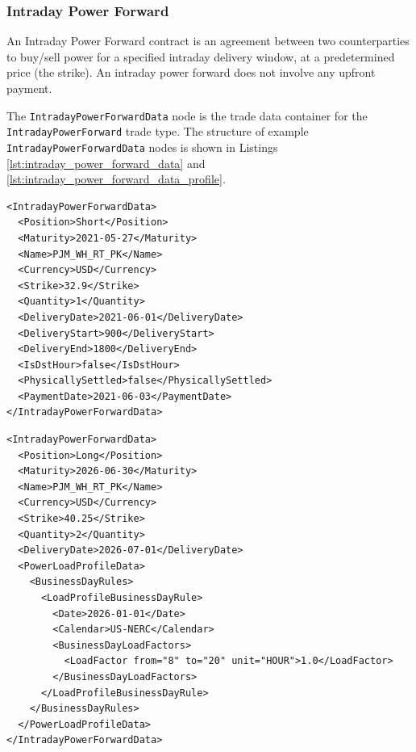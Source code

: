 \subsubsection{Intraday Power Forward}

An Intraday Power Forward contract is an agreement between two counterparties to buy/sell
power for a specified intraday delivery window, at a predetermined price (the strike).
An intraday power forward does not involve any upfront payment.

The \lstinline!IntradayPowerForwardData! node is the trade data container for the
\lstinline!IntradayPowerForward! trade type. The structure of example
\lstinline!IntradayPowerForwardData! nodes is shown in Listings \ref{lst:intraday_power_forward_data}
and \ref{lst:intraday_power_forward_data_profile}.

\begin{listing}[H]
\begin{verbatim}
<IntradayPowerForwardData>
  <Position>Short</Position>
  <Maturity>2021-05-27</Maturity>
  <Name>PJM_WH_RT_PK</Name>
  <Currency>USD</Currency>
  <Strike>32.9</Strike>
  <Quantity>1</Quantity>
  <DeliveryDate>2021-06-01</DeliveryDate>
  <DeliveryStart>900</DeliveryStart>
  <DeliveryEnd>1800</DeliveryEnd>
  <IsDstHour>false</IsDstHour>
  <PhysicallySettled>false</PhysicallySettled>
  <PaymentDate>2021-06-03</PaymentDate>
</IntradayPowerForwardData>
\end{verbatim}
\caption{Intraday power forward data with explicit delivery window}
\label{lst:intraday_power_forward_data}
\end{listing}

\begin{listing}[H]
\begin{verbatim}
<IntradayPowerForwardData>
  <Position>Long</Position>
  <Maturity>2026-06-30</Maturity>
  <Name>PJM_WH_RT_PK</Name>
  <Currency>USD</Currency>
  <Strike>40.25</Strike>
  <Quantity>2</Quantity>
  <DeliveryDate>2026-07-01</DeliveryDate>
  <PowerLoadProfileData>
    <BusinessDayRules>
      <LoadProfileBusinessDayRule>
        <Date>2026-01-01</Date>
        <Calendar>US-NERC</Calendar>
        <BusinessDayLoadFactors>
          <LoadFactor from="8" to="20" unit="HOUR">1.0</LoadFactor>
        </BusinessDayLoadFactors>
      </LoadProfileBusinessDayRule>
    </BusinessDayRules>
  </PowerLoadProfileData>
</IntradayPowerForwardData>
\end{verbatim}
\caption{\lstinline!IntradayPowerForwardData! with \lstinline!PowerLoadProfileData!}
\label{lst:intraday_power_forward_data_profile}
\end{listing}

